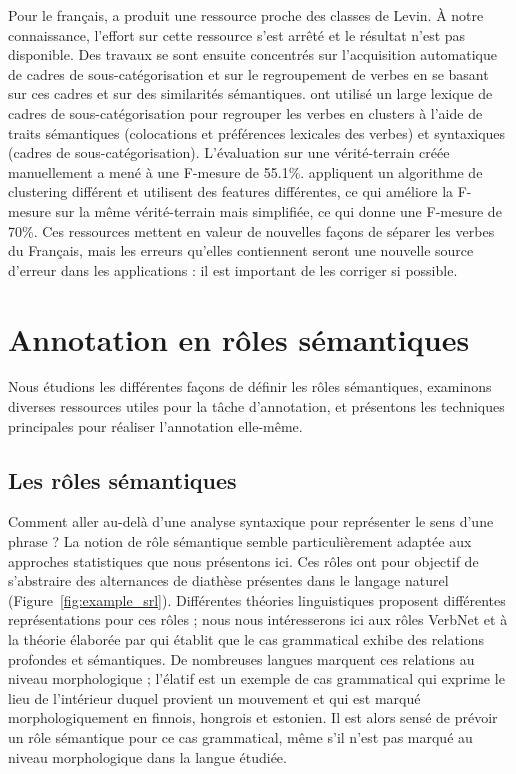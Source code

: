 Pour le français, \cite{saintdizier1996constructing} a produit une ressource
proche des classes de Levin. À notre connaissance, l'effort sur cette ressource
s'est arrêté et le résultat n'est pas disponible. Des travaux se sont ensuite
concentrés sur l'acquisition automatique de cadres de sous-catégorisation et
sur le regroupement de verbes en se basant sur ces cadres et sur des
similarités sémantiques. \cite{sun2010investigating} ont utilisé un large
lexique de cadres de sous-catégorisation \citep{messiant2010acquisition} pour
regrouper les verbes en clusters à l'aide de traits sémantiques (colocations et
préférences lexicales des verbes) et syntaxiques (cadres de
sous-catégorisation). L'évaluation sur une vérité-terrain créée manuellement a
mené à une F-mesure de 55.1\%. \cite{falk2012classifying} appliquent un
algorithme de clustering différent et utilisent des features différentes, ce
qui améliore la F-mesure sur la même vérité-terrain mais simplifiée, ce qui
donne une F-mesure de 70\%. Ces ressources mettent en valeur de nouvelles
façons de séparer les verbes du Français, mais les erreurs qu'elles contiennent
seront une nouvelle source d'erreur dans les applications : il est important de
les corriger si possible.


\section{Annotation en rôles sémantiques}
\label{sec:srl}

Nous étudions les différentes façons de définir les rôles sémantiques,
examinons diverses ressources utiles pour la tâche d'annotation, et présentons
les techniques principales pour réaliser l'annotation elle-même.


\subsection{Les rôles sémantiques}
\label{subsec:roles_semantiques}

Comment aller au-delà d'une analyse syntaxique pour représenter le sens d'une
phrase ? La notion de rôle sémantique semble particulièrement adaptée aux
approches statistiques que nous présentons ici. Ces rôles ont pour objectif de
s'abstraire des alternances de diathèse présentes dans le langage naturel
(Figure~\ref{fig:example_srl}). Différentes théories linguistiques proposent
différentes représentations pour ces rôles ; nous nous intéresserons ici aux
rôles VerbNet et à la théorie élaborée par \cite{fillmore1968case} qui établit
que le cas grammatical exhibe des relations profondes et sémantiques. De
nombreuses langues marquent ces relations au niveau morphologique ; l'élatif
est un exemple de cas grammatical qui exprime le lieu de l'intérieur duquel
provient un mouvement et qui est marqué morphologiquement en finnois, hongrois
et estonien. Il est alors sensé de prévoir un rôle sémantique pour ce cas
grammatical, même s'il n'est pas marqué au niveau morphologique dans la langue
étudiée.

